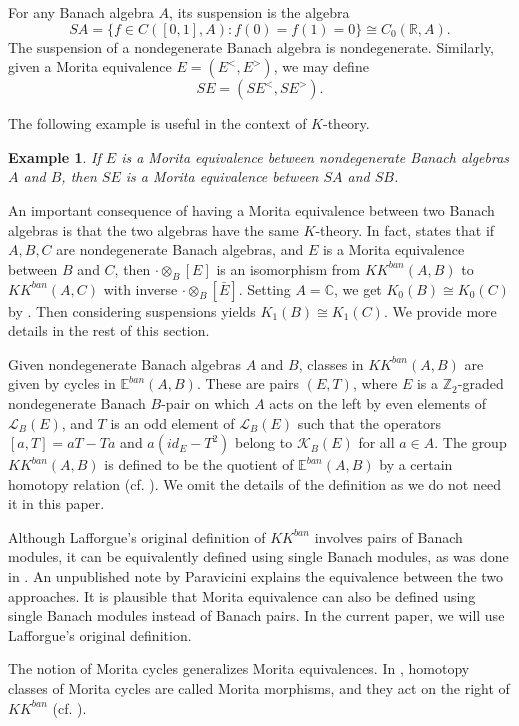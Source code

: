 \documentclass[a4,11pt]{amsart}
\newtheorem{ex}[thm]{Example}
\theoremstyle{remark}
\begin{document}
For any Banach algebra $A$, its suspension is the algebra \[SA=\{ f\in C([0,1],A):f(0)=f(1)=0 \}\cong C_0(\mathbb{R},A).\]
The suspension of a nondegenerate Banach algebra is nondegenerate.
Similarly, given a Morita equivalence $E=(E^<,E^>)$, we may define \[SE=(SE^<,SE^>).\]

The following example is useful in the context of $K$-theory.

\begin{ex}
If $E$ is a Morita equivalence between nondegenerate Banach algebras $A$ and $B$, then $SE$ is a Morita equivalence between $SA$ and $SB$.
\end{ex}

An important consequence of having a Morita equivalence between two Banach algebras is that the two algebras have the same $K$-theory.
In fact, \cite[Theorem 5.29]{Par09} states that if $A,B,C$ are nondegenerate Banach algebras, and $E$ is a Morita equivalence between $B$ and $C$, then $\cdot\otimes_B[E]$ is an isomorphism from $KK^{ban}(A,B)$ to $KK^{ban}(A,C)$ with inverse $\cdot\otimes_B[\bar{E}]$.
Setting $A=\mathbb{C}$, we get $K_0(B)\cong K_0(C)$ by \cite[Th\'{e}or\`{e}me 1.2.8]{Laf02}.
Then considering suspensions yields $K_1(B)\cong K_1(C)$. 
We provide more details in the rest of this section.

Given nondegenerate Banach algebras $A$ and $B$, classes in $KK^{ban}(A,B)$ are given by cycles in $\mathbb{E}^{ban}(A,B)$.
These are pairs $(E,T)$, where $E$ is a $\mathbb{Z}_2$-graded nondegenerate Banach $B$-pair on which $A$ acts on the left by even elements of $\mathcal{L}_B(E)$, and $T$ is an odd element of $\mathcal{L}_B(E)$ such that the operators $[a,T]=aT-Ta$ and $a(id_E-T^2)$ belong to $\mathcal{K}_B(E)$ for all $a\in A$.
The group $KK^{ban}(A,B)$ is defined to be the quotient of $\mathbb{E}^{ban}(A,B)$ by a certain homotopy relation (cf. \cite[D\'{e}finition 1.2.2]{Laf02}).
We omit the details of the definition as we do not need it in this paper.

Although Lafforgue's original definition of $KK^{ban}$ involves pairs of Banach modules, it can be equivalently defined using single Banach modules, as was done in \cite{Laf02a}. An unpublished note \cite{Par} by Paravicini explains the equivalence between the two approaches. 
It is plausible that Morita equivalence can also be defined using single Banach modules instead of Banach pairs.
In the current paper, we will use Lafforgue's original definition.

The notion of Morita cycles generalizes Morita equivalences. In \cite[Section 5.3]{Par09}, homotopy classes of Morita cycles are called Morita morphisms, and they act on the right of $KK^{ban}$ (cf. \cite[Section 5.7]{Par09}).
\end{document}
